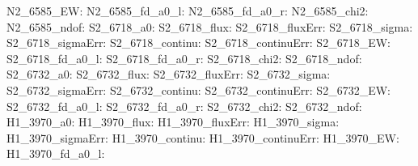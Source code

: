 N2\_6585\_EW:  \newline 
N2\_6585\_fd\_a0\_l:  \newline 
N2\_6585\_fd\_a0\_r:  \newline 
N2\_6585\_chi2:  \newline 
N2\_6585\_ndof:  \newline 
S2\_6718\_a0:  \newline 
S2\_6718\_flux:  \newline 
S2\_6718\_fluxErr:  \newline 
S2\_6718\_sigma:  \newline 
S2\_6718\_sigmaErr:  \newline 
S2\_6718\_continu:  \newline 
S2\_6718\_continuErr:  \newline 
S2\_6718\_EW:  \newline 
S2\_6718\_fd\_a0\_l:  \newline 
S2\_6718\_fd\_a0\_r:  \newline 
S2\_6718\_chi2:  \newline 
S2\_6718\_ndof:  \newline 
S2\_6732\_a0:  \newline 
S2\_6732\_flux:  \newline 
S2\_6732\_fluxErr:  \newline 
S2\_6732\_sigma:  \newline 
S2\_6732\_sigmaErr:  \newline 
S2\_6732\_continu:  \newline 
S2\_6732\_continuErr:  \newline 
S2\_6732\_EW:  \newline 
S2\_6732\_fd\_a0\_l:  \newline 
S2\_6732\_fd\_a0\_r:  \newline 
S2\_6732\_chi2:  \newline 
S2\_6732\_ndof:  \newline 
H1\_3970\_a0:  \newline 
H1\_3970\_flux:  \newline 
H1\_3970\_fluxErr:  \newline 
H1\_3970\_sigma:  \newline 
H1\_3970\_sigmaErr:  \newline 
H1\_3970\_continu:  \newline 
H1\_3970\_continuErr:  \newline 
H1\_3970\_EW:  \newline 
H1\_3970\_fd\_a0\_l:  \newline 
